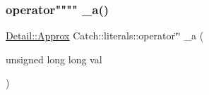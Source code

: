 \subsubsection{\texorpdfstring{operator"""" \+\_\+a()}{operator"" \_a()}\hspace{0.1cm}{\footnotesize\ttfamily [2/2]}}
{\footnotesize\ttfamily \mbox{\hyperlink{class_catch_1_1_detail_1_1_approx}{Detail\+::\+Approx}} Catch\+::literals\+::operator\char`\"{}\char`\"{} \+\_\+a (\begin{DoxyParamCaption}\item[{unsigned long long}]{val }\end{DoxyParamCaption})}

